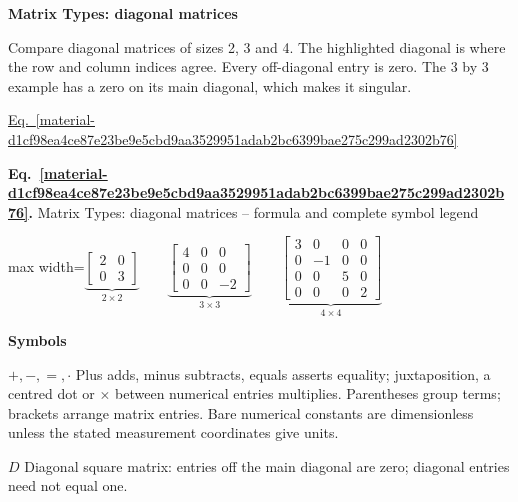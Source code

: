 \documentclass[11pt,a4paper]{article}
\begin{document}
\textbf{Matrix Types: diagonal matrices}


Compare diagonal matrices of sizes 2, 3 and 4. The highlighted diagonal is where the row and column indices agree. Every off-diagonal entry is zero. The 3 by 3 example has a zero on its main diagonal, which makes it singular.


\hyperref[material-d1cf98ea4ce87e23be9e5cbd9aa3529951adab2bc6399bae275c299ad2302b76]{Eq.~\ref*{material-d1cf98ea4ce87e23be9e5cbd9aa3529951adab2bc6399bae275c299ad2302b76}}


\par\medskip
\noindent\begin{minipage}{\linewidth}
\label{material-d1cf98ea4ce87e23be9e5cbd9aa3529951adab2bc6399bae275c299ad2302b76}
\noindent\textbf{Eq.~\ref*{material-d1cf98ea4ce87e23be9e5cbd9aa3529951adab2bc6399bae275c299ad2302b76}.} Matrix Types: diagonal matrices – formula and complete symbol legend\par\nopagebreak
\begin{center}\begin{adjustbox}{max width=\linewidth}$\displaystyle \underbrace{\begin{bmatrix}\boxed{2}&0\\0&\boxed{3}\end{bmatrix}}_{2\times2}\qquad\underbrace{\begin{bmatrix}\boxed{4}&0&0\\0&\boxed{0}&0\\0&0&\boxed{-2}\end{bmatrix}}_{3\times3}\qquad\underbrace{\begin{bmatrix}\boxed{3}&0&0&0\\0&\boxed{-1}&0&0\\0&0&\boxed{5}&0\\0&0&0&\boxed{2}\end{bmatrix}}_{4\times4}$\end{adjustbox}\end{center}

\par\noindent\textbf{Symbols}

\par\noindent\textbf{\(+,-,=,\cdot\)} Plus adds, minus subtracts, equals asserts equality; juxtaposition, a centred dot or \ensuremath{\times} between numerical entries multiplies. Parentheses group terms; brackets arrange matrix entries. Bare numerical constants are dimensionless unless the stated measurement coordinates give units.

\par\noindent\textbf{\(D\)} Diagonal square matrix: entries off the main diagonal are zero; diagonal entries need not equal one.

\end{minipage}\par
\medskip
\end{document}
